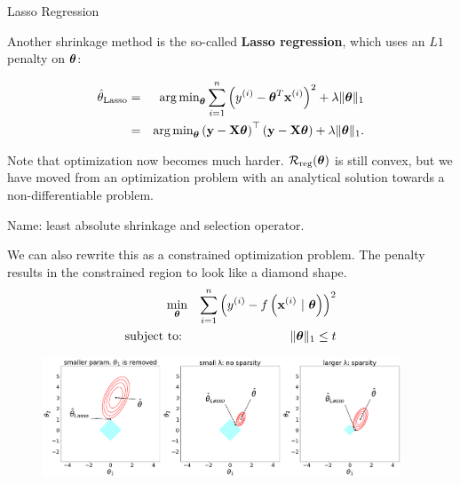 \documentclass[11pt,compress,t,notes=noshow, xcolor=table]{beamer}
\begin{document}

\begin{vbframe}{Lasso Regression}

Another shrinkage method is the so-called \textbf{Lasso regression}, which uses an $L1$ penalty on $\bm{\theta}$:

\begin{eqnarray*}
\hat{\theta}_{\text{Lasso}} &=&  \operatorname{arg\,min}_{\bm{\theta}} \sum\limits_{i=1}^n \left(y^{(i)} - \bm{\theta}^T \mathbf{x}^{(i)}\right)^2 + \lambda \|\bm{\theta}\|_1 \\
  &=& \operatorname{arg\,min}_{\bm{\theta}} \left(\mathbf{y} - \mathbf{X} \bm{\theta}\right)^\top \left(\mathbf{y} - \mathbf{X} \bm{\theta}\right) + \lambda \|\bm{\theta}\|_1.
\end{eqnarray*}

Note that optimization now becomes much harder. $\mathcal{R}_{\text{reg}}(\bm{\theta})$ is still convex, but we have moved from an optimization problem with an analytical solution towards a non-differentiable problem.

\lz

Name: least absolute shrinkage and selection operator.

\framebreak 

We can also rewrite this as a constrained optimization problem. The penalty results in the constrained region to look like a diamond shape.
\vspace{-0.2cm}
\begin{eqnarray*}
\min_{\bm{\theta}} && \sum\limits_{i=1}^n \left(y^{(i)} - f\left(\mathbf{x}^{(i)} ~|~ \bm{\theta}\right)\right)^2\\
\text{subject to: } && \|\bm{\theta}\|_1 \leq t \\
\end{eqnarray*}
\vspace{-0.2cm}
\begin{figure}%
\includegraphics[width=0.95\textwidth]{figure/lasso_contours_cases.png}\\
\end{figure}

\end{vbframe}
\end{document}
